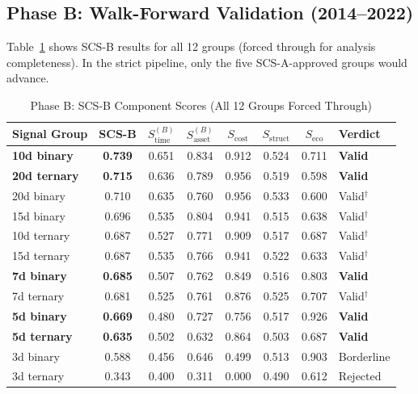 \documentclass[12pt,a4paper]{article}
\begin{document}
\subsection{Phase B: Walk-Forward Validation (2014--2022)}

Table~\ref{tab:phase_b} shows SCS-B results for all 12 groups (forced through for analysis completeness). In the strict pipeline, only the five SCS-A-approved groups would advance.

\begin{table}[H]
\centering
\caption{Phase B: SCS-B Component Scores (All 12 Groups Forced Through)}
\label{tab:phase_b}
\begin{tabular}{lccccccl}
\toprule
Signal Group & SCS-B & $S_{\text{time}}^{(B)}$ & $S_{\text{asset}}^{(B)}$ & $S_{\text{cost}}$ & $S_{\text{struct}}$ & $S_{\text{eco}}$ & Verdict \\
\midrule
\textbf{10d binary}  & \textbf{0.739} & 0.651 & 0.834 & 0.912 & 0.524 & 0.711 & \textbf{Valid} \\
\textbf{20d ternary} & \textbf{0.715} & 0.636 & 0.789 & 0.956 & 0.519 & 0.598 & \textbf{Valid} \\
20d binary           & 0.710 & 0.635 & 0.760 & 0.956 & 0.533 & 0.600 & Valid$^\dagger$ \\
15d binary           & 0.696 & 0.535 & 0.804 & 0.941 & 0.515 & 0.638 & Valid$^\dagger$ \\
10d ternary          & 0.687 & 0.527 & 0.771 & 0.909 & 0.517 & 0.687 & Valid$^\dagger$ \\
15d ternary          & 0.687 & 0.535 & 0.766 & 0.941 & 0.522 & 0.633 & Valid$^\dagger$ \\
\textbf{7d binary}   & \textbf{0.685} & 0.507 & 0.762 & 0.849 & 0.516 & 0.803 & \textbf{Valid} \\
7d ternary           & 0.681 & 0.525 & 0.761 & 0.876 & 0.525 & 0.707 & Valid$^\dagger$ \\
\textbf{5d binary}   & \textbf{0.669} & 0.480 & 0.727 & 0.756 & 0.517 & 0.926 & \textbf{Valid} \\
\textbf{5d ternary}  & \textbf{0.635} & 0.502 & 0.632 & 0.864 & 0.503 & 0.687 & \textbf{Valid} \\
3d binary            & 0.588 & 0.456 & 0.646 & 0.499 & 0.513 & 0.903 & Borderline \\
3d ternary           & 0.343 & 0.400 & 0.311 & 0.000 & 0.490 & 0.612 & Rejected \\
\bottomrule
\end{tabular}
\end{table}
\end{document}
